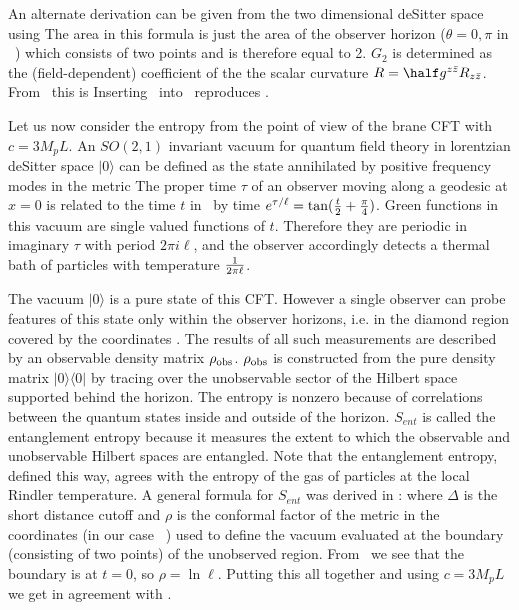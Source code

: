An alternate derivation can be given from the
two dimensional deSitter space using
\eqn{}
The area in this formula is just the area of the observer horizon
($\theta=0,\pi$ in \rtzy\ ) which consists of two points and is therefore
equal to 2.  $G_2$ is determined as the (field-dependent) coefficient of
the the scalar curvature $R=\half g^{z \bar z}R_{z \bar z}$.
{}From \sacy\ this is
\eqn{}
Inserting \fyj\ into \sfj\ reproduces
\wki.

Let us now consider the entropy from the point of view of the
brane CFT with $c=3M_pL$. An $SO(2,1)$ invariant vacuum for quantum field theory in
lorentzian deSitter space $|0 \rangle $ can be defined as the
state annihilated by positive frequency modes in the metric
\eqn{}
The proper time $\tau$
of an observer moving along a geodesic at
$x=0$ is related to the time $t$ in \dss\ by  time $e^{\tau/\ell} =
\tan({t\over 2}+{\pi \over 4})$.  Green functions in this vacuum
are single valued functions of $t$. Therefore they are periodic in
imaginary $\tau$ with period $2\pi i \ell$, and the observer accordingly
detects a thermal bath of particles with temperature $1 \over 2 \pi  \ell$.

The vacuum $|0 \rangle $ is a pure state
of this CFT. However a single observer can probe features of
this state
only within the observer horizons, i.e. in the diamond
region covered by the coordinates \rtzy. The results of
all such measurements are described by an observable density matrix
$\rho_{\rm obs}$. $\rho_{\rm obs}$ is constructed from the pure density matrix
$|0\rangle \langle 0|$ by tracing over the unobservable sector of the
Hilbert space supported behind the horizon. The entropy
\eqn{}
is nonzero because of correlations between the quantum states inside and
outside of the horizon. $S_{ent}$ is called the entanglement entropy
because it measures the extent to which the observable and unobservable
Hilbert spaces are
entangled. Note that the entanglement entropy, defined this way, agrees 
with the entropy of the gas of particles at the local Rindler temperature. 
 A general formula for $S_{ent}$ was derived in
:
\eqn{}
where $\Delta$ is the  short distance cutoff
and $\rho$ is the conformal factor of the metric in the coordinates (in our
case \dss\ ) used to define the vacuum evaluated at the boundary
(consisting of two points) of the
unobserved region. From \dss\ we see that the boundary is at
$t=0$, so $\rho = \ln \ell$. Putting this all together and using
$c=3M_pL$ we get
\eqn{}
in agreement with  \sfa.




